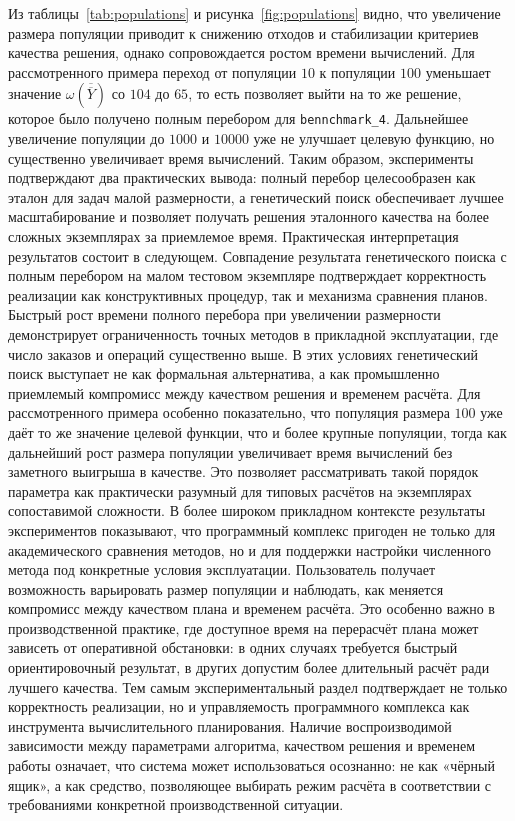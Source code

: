Из таблицы~\ref{tab:populations} и рисунка~\ref{fig:populations} видно, что увеличение размера популяции приводит к снижению отходов и стабилизации критериев качества решения, однако сопровождается ростом времени вычислений.
Для рассмотренного примера переход от популяции $10$ к популяции $100$ уменьшает значение $\omega(\overline{\overline{Y}})$ со $104$ до $65$, то есть позволяет выйти на то же решение, которое было получено полным перебором для \texttt{bennchmark\_4}.
Дальнейшее увеличение популяции до $1000$ и $10000$ уже не улучшает целевую функцию, но существенно увеличивает время вычислений.
Таким образом, эксперименты подтверждают два практических вывода: полный перебор целесообразен как эталон для задач малой размерности, а генетический поиск обеспечивает лучшее масштабирование и позволяет получать решения эталонного качества на более сложных экземплярах за приемлемое время. Практическая интерпретация результатов состоит в следующем. Совпадение результата генетического поиска с полным перебором на малом тестовом экземпляре подтверждает корректность реализации как конструктивных процедур, так и механизма сравнения планов. Быстрый рост времени полного перебора при увеличении размерности демонстрирует ограниченность точных методов в прикладной эксплуатации, где число заказов и операций существенно выше. В этих условиях генетический поиск выступает не как формальная альтернатива, а как промышленно приемлемый компромисс между качеством решения и временем расчёта. Для рассмотренного примера особенно показательно, что популяция размера $100$ уже даёт то же значение целевой функции, что и более крупные популяции, тогда как дальнейший рост размера популяции увеличивает время вычислений без заметного выигрыша в качестве. Это позволяет рассматривать такой порядок параметра как практически разумный для типовых расчётов на экземплярах сопоставимой сложности.
В более широком прикладном контексте результаты экспериментов показывают, что программный комплекс пригоден не только для академического сравнения методов, но и для поддержки настройки численного метода под конкретные условия эксплуатации. Пользователь получает возможность варьировать размер популяции и наблюдать, как меняется компромисс между качеством плана и временем расчёта. Это особенно важно в производственной практике, где доступное время на перерасчёт плана может зависеть от оперативной обстановки: в одних случаях требуется быстрый ориентировочный результат, в других допустим более длительный расчёт ради лучшего качества.
Тем самым экспериментальный раздел подтверждает не только корректность реализации, но и управляемость программного комплекса как инструмента вычислительного планирования. Наличие воспроизводимой зависимости между параметрами алгоритма, качеством решения и временем работы означает, что система может использоваться осознанно: не как «чёрный ящик», а как средство, позволяющее выбирать режим расчёта в соответствии с требованиями конкретной производственной ситуации.




